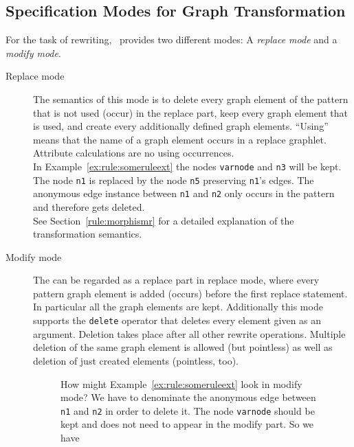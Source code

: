 \subsection{Specification Modes for Graph Transformation}
For the task of rewriting, \GrG\ provides two different modes: A \emph{replace mode} and a \emph{modify mode}.
\begin{description}
  \item[Replace mode] The semantics of this mode is to delete every graph element of the pattern that is not used (occur) in the replace part, keep every graph element that is used, and create every additionally defined graph elements. ``Using'' means that the name of a graph element occurs in a replace graphlet. Attribute calculations are no using occurrences.\\
  In Example~\ref{ex:rule:someruleext} the nodes \texttt{varnode} and \texttt{n3} will be kept. The node \texttt{n1} is replaced by the node \texttt{n5} preserving \texttt{n1}'s edges. The anonymous edge instance between \texttt{n1} and \texttt{n2} only occurs in the pattern and therefore gets deleted.\\
See Section~\ref{rule:morphismr} for a detailed explanation of the transformation semantics. 
  \item[Modify mode] The  can be regarded as a replace part in replace mode, where every pattern graph element is added (occurs) before the first replace statement. 
In particular all the  graph elements are kept. 
Additionally this mode supports the \texttt{delete} operator that deletes every element given as an argument. 
Deletion takes place after all other rewrite operations. Multiple deletion of the same graph element is allowed (but pointless) as well as deletion of just created elements (pointless, too).
\begin{figure}[htbp]
\begin{example}
How might Example~\ref{ex:rule:someruleext} look in modify mode? 
We have to denominate the anonymous edge between \texttt{n1} and \texttt{n2} in order to delete it. 
The node \texttt{varnode} should be kept and does not need to appear in the modify part. 
So we have
\begin{grgen}
rule SomeRuleExtModify(varnode: Node): (Node, EdgeTypeB)  {
  pattern {
    ...
    n1 -e0:Edge-> n2;
    ...
  }
  modify {
    n5 : NodeTypeC<n1>;
    n3 -e1:EdgeTypeB-> n5;
    delete(e0);
    eval {
      ...
\end{grgen}
\end{example}
\end{figure}
\end{description}

